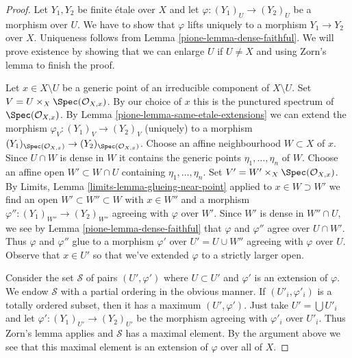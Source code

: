 \begin{proof}

Let $Y_1, Y_2$ be finite \'etale over $X$ and let
$\varphi : (Y_1)_U \to (Y_2)_U$ be a morphism over $U$. We have to show that
$\varphi$ lifts uniquely to a morphism $Y_1 \to Y_2$ over $X$.
Uniqueness follows from Lemma \ref{pione-lemma-dense-faithful}.
We will prove existence by showing that we can enlarge $U$
if $U \not = X$ and using Zorn's lemma to finish the proof.

\medskip\noindent
Let $x \in X \setminus U$ be a generic point of an irreducible component
of $X \setminus U$. Set $V = U \times_X \Spec(\mathcal{O}_{X, x})$.
By our choice of $x$ this is the punctured spectrum of
$\Spec(\mathcal{O}_{X, x})$. By
Lemma \ref{pione-lemma-same-etale-extensions}
we can extend the morphism $\varphi_V : (Y_1)_V \to (Y_2)_V$
(uniquely) to a morphism
$(Y_1)_{\Spec(\mathcal{O}_{X, x})} \to (Y_2)_{\Spec(\mathcal{O}_{X, x})}$.
Choose an affine neighbourhood $W \subset X$ of $x$.
Since $U \cap W$ is dense in $W$ it contains the generic points
$\eta_1, \ldots, \eta_n$ of $W$. Choose an affine open
$W' \subset W \cap U$ containing $\eta_1, \ldots, \eta_n$.
Set $V' = W' \times_X \Spec(\mathcal{O}_{X, x})$.
By Limits, Lemma \ref{limits-lemma-glueing-near-point}
applied to $x \in W \supset W'$
we find an open $W' \subset W'' \subset W$ with $x \in W''$
and a morphism $\varphi'' : (Y_1)_{W''} \to (Y_2)_{W''}$
agreeing with $\varphi$ over $W'$. Since $W'$ is dense in
$W'' \cap U$, we see by Lemma \ref{pione-lemma-dense-faithful}
that $\varphi$ and $\varphi''$ agree over $U \cap W'$.
Thus $\varphi$ and $\varphi''$ glue to a morphism
$\varphi'$ over $U' = U \cup W''$ agreeing with $\varphi$ over $U$.
Observe that $x \in U'$ so that we've extended $\varphi$
to a strictly larger open.

\medskip\noindent
Consider the set $\mathcal{S}$ of pairs $(U', \varphi')$ where $U \subset U'$
and $\varphi'$ is an extension of $\varphi$. We endow $\mathcal{S}$
with a partial ordering in the obvious manner. If $(U'_i, \varphi'_i)$
is a totally ordered subset, then it has a maximum $(U', \varphi')$.
Just take $U' = \bigcup U'_i$ and let
$\varphi' : (Y_1)_{U'} \to (Y_2)_{U'}$ be the morphism
agreeing with $\varphi'_i$ over $U'_i$. Thus Zorn's lemma applies
and $\mathcal{S}$ has a maximal element. By the argument above
we see that this maximal element is an extension of $\varphi$
over all of $X$.
\end{proof}

